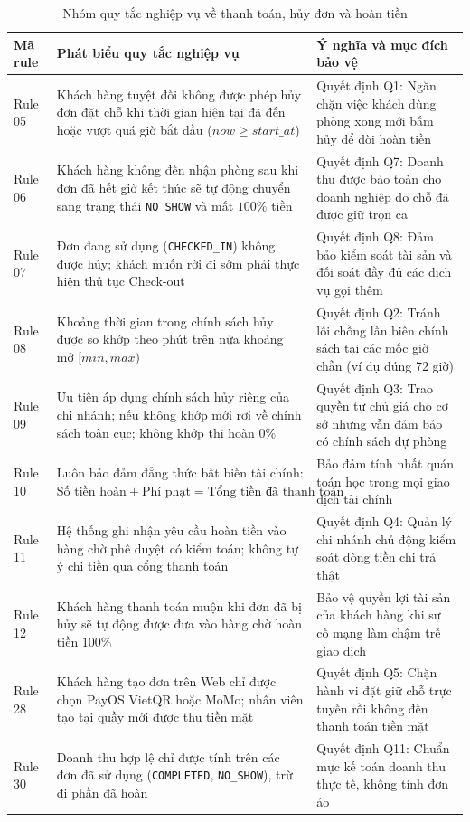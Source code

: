 \begin{table}[H]
\centering
\caption{Nhóm quy tắc nghiệp vụ về thanh toán, hủy đơn và hoàn tiền}
\label{tab:rule_payment}
\small
\renewcommand{\arraystretch}{1.25}
\begin{tabular}{|p{1.4cm}|p{7.4cm}|p{5.6cm}|}
\hline
\textbf{Mã rule} & \textbf{Phát biểu quy tắc nghiệp vụ} & \textbf{Ý nghĩa và mục đích bảo vệ} \\
\hline
Rule 05 & Khách hàng tuyệt đối không được phép hủy đơn đặt chỗ khi thời gian hiện tại đã đến hoặc vượt quá giờ bắt đầu ($now \ge start\_at$) & Quyết định Q1: Ngăn chặn việc khách dùng phòng xong mới bấm hủy để đòi hoàn tiền \\
\hline
Rule 06 & Khách hàng không đến nhận phòng sau khi đơn đã hết giờ kết thúc sẽ tự động chuyển sang trạng thái \texttt{NO\_SHOW} và mất $100\%$ tiền & Quyết định Q7: Doanh thu được bảo toàn cho doanh nghiệp do chỗ đã được giữ trọn ca \\
\hline
Rule 07 & Đơn đang sử dụng (\texttt{CHECKED\_IN}) không được hủy; khách muốn rời đi sớm phải thực hiện thủ tục Check-out & Quyết định Q8: Đảm bảo kiểm soát tài sản và đối soát đầy đủ các dịch vụ gọi thêm \\
\hline
Rule 08 & Khoảng thời gian trong chính sách hủy được so khớp theo phút trên nửa khoảng mở $[min, max)$ & Quyết định Q2: Tránh lỗi chồng lấn biên chính sách tại các mốc giờ chẵn (ví dụ đúng 72 giờ) \\
\hline
Rule 09 & Ưu tiên áp dụng chính sách hủy riêng của chi nhánh; nếu không khớp mới rơi về chính sách toàn cục; không khớp thì hoàn $0\%$ & Quyết định Q3: Trao quyền tự chủ giá cho cơ sở nhưng vẫn đảm bảo có chính sách dự phòng \\
\hline
Rule 10 & Luôn bảo đảm đẳng thức bất biến tài chính: $\text{Số tiền hoàn} + \text{Phí phạt} = \text{Tổng tiền đã thanh toán}$ & Bảo đảm tính nhất quán toán học trong mọi giao dịch tài chính \\
\hline
Rule 11 & Hệ thống ghi nhận yêu cầu hoàn tiền vào hàng chờ phê duyệt có kiểm toán; không tự ý chi tiền qua cổng thanh toán & Quyết định Q4: Quản lý chi nhánh chủ động kiểm soát dòng tiền chi trả thật \\
\hline
Rule 12 & Khách hàng thanh toán muộn khi đơn đã bị hủy sẽ tự động được đưa vào hàng chờ hoàn tiền $100\%$ & Bảo vệ quyền lợi tài sản của khách hàng khi sự cố mạng làm chậm trễ giao dịch \\
\hline
Rule 28 & Khách hàng tạo đơn trên Web chỉ được chọn PayOS VietQR hoặc MoMo; nhân viên tạo tại quầy mới được thu tiền mặt & Quyết định Q5: Chặn hành vi đặt giữ chỗ trực tuyến rồi không đến thanh toán tiền mặt \\
\hline
Rule 30 & Doanh thu hợp lệ chỉ được tính trên các đơn đã sử dụng (\texttt{COMPLETED}, \texttt{NO\_SHOW}), trừ đi phần đã hoàn & Quyết định Q11: Chuẩn mực kế toán doanh thu thực tế, không tính đơn ảo \\
\hline
\end{tabular}
\end{table}


